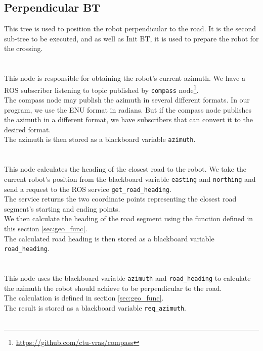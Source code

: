 \subsection{Perpendicular BT}
\label{sec:Perpendicular-BT-impl}
    This tree is used to position the robot perpendicular to the road. It is the second sub-tree to be executed, and as well as Init BT, it is used to prepare the robot for the crossing.\\\\
    \\
        This node is responsible for obtaining the robot's current azimuth. We have a ROS subscriber listening to topic published by \texttt{compass} node\footnote{\url{https://github.com/ctu-vras/compass}}.\\
        The compass node may publish the azimuth in several different formats. In our program, we use the ENU format in radians. But if the compass node publishes the azimuth in a different format, we have subscribers that can convert it to the desired format.\\
        The azimuth is then stored as a blackboard variable \texttt{azimuth}.\\\\
    \\
        This node calculates the heading of the closest road to the robot. We take the current robot's position from the blackboard variable \texttt{easting} and \texttt{northing} and send a request to the ROS service \texttt{get\_road\_heading}.\\
        The service returns the two coordinate points representing the closest road segment's starting and ending points.\\
        We then calculate the heading of the road segment using the function defined in this section \ref{sec:geo_func}.\\
        The calculated road heading is then stored as a blackboard variable \texttt{road\_heading}.\\\\
    \\
        This node uses the blackboard variable \texttt{azimuth} and \texttt{road\_heading} to calculate the azimuth the robot should achieve to be perpendicular to the road.\\
        The calculation is defined in section \ref{sec:geo_func}.\\
        The result is stored as a blackboard variable \texttt{req\_azimuth}.\\\\
